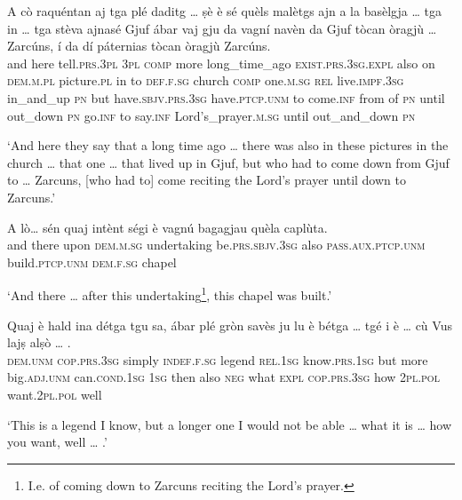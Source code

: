 \begin{linenumbers}
\gll A cò raquéntan aj tga plé daditg … ṣè è sé quèls malètgs ajn a la basèlgja … tga in … tga stèva ajnasé Gjuf ábar vaj gju da vagní navèn da Gjuf tòcan òragjù … Zarcúns, í da dí páternias tòcan òragjù Zarcúns.\\
and here tell.\textsc{prs.3pl} \textsc{3pl} \textsc{comp} more long\_time\_ago {} \textsc{exist.prs.3sg.expl} also on \textsc{dem.m.pl} picture.\textsc{pl} in to \textsc{def.f.sg} church {} \textsc{comp} one.\textsc{m.sg} {} \textsc{rel} live.\textsc{impf.3sg} in\_and\_up \textsc{pn} but  have.\textsc{sbjv.prs.3sg} have.\textsc{ptcp.unm} to come.\textsc{inf} from of \textsc{pn} until out\_down {} \textsc{pn} go.\textsc{inf} to say.\textsc{inf} Lord's\_prayer.\textsc{m.sg} until out\_and\_down \textsc{pn}\\
\end{linenumbers}
\medskip
\glt `And here they say that a long time ago … there was also in these pictures in the church … that one … that lived up in Gjuf, but who had to come down from Gjuf to … Zarcuns, [who had to] come reciting the Lord's prayer until down to Zarcuns.'
\medskip

\begin{linenumbers}
\gll    A lò… sén quaj intènt ségi è vagnú bagagjau quèla caplùta.\\
and there upon \textsc{dem.m.sg} undertaking be.\textsc{prs.sbjv.3sg} also \textsc{pass.aux.ptcp.unm} build.\textsc{ptcp.unm} \textsc{dem.f.sg} chapel \\
\end{linenumbers}
\medskip
\glt `And there … after this undertaking\footnote{I.e. of coming down to Zarcuns reciting the Lord's prayer.}, this chapel was built.'
\medskip

\begin{linenumbers}
\gll    Quaj è hald ina détga tgu sa, ábar plé gròn savès ju lu è bétga … tgé i è … cù Vus lajṣ alṣò … .\\
 \textsc{dem.unm} \textsc{cop.prs.3sg} simply \textsc{indef.f.sg} legend \textsc{rel.1sg} know.\textsc{prs.1sg} but more big.\textsc{adj.unm} can.\textsc{cond.1sg} \textsc{1sg} then also \textsc{neg} {} what \textsc{expl}  \textsc{cop.prs.3sg} {} how \textsc{2pl.pol} want.\textsc{2pl.pol} well\\
\end{linenumbers}
\medskip
\glt `This is a legend I know, but a longer one I would not be able … what it is … how you want, well … .'
\clearpage


